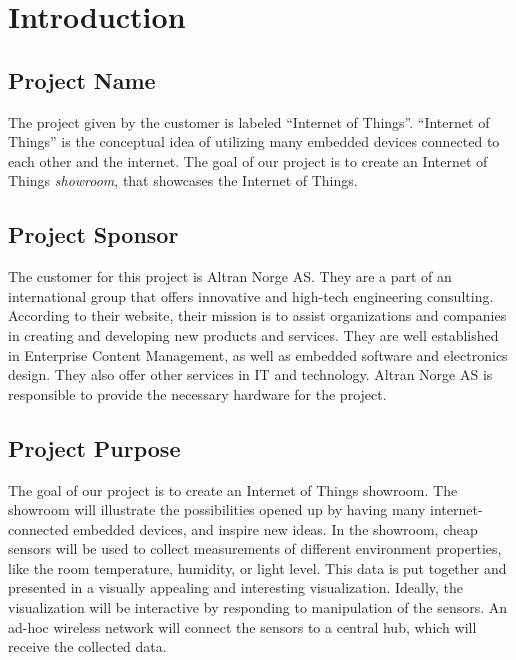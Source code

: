﻿\documentclass[../document.tex]{subfiles}
\begin{document}
\section*{Introduction}

\subsection*{Project Name}
The project given by the customer is labeled ``Internet of Things''. ``Internet of Things'' is the conceptual idea of utilizing many embedded devices connected to each other and the internet. The goal of our project is to create an Internet of Things \emph{showroom}, that showcases the Internet of Things.


\subsection*{Project Sponsor}
The customer for this project is Altran Norge AS. They are a part of an international group that offers innovative and high-tech engineering consulting. According to their website, their mission is to assist organizations and companies in creating and developing new products and services. They are well established in Enterprise Content Management, as well as embedded software and electronics design. They also offer other services in IT and technology. Altran Norge AS is responsible to provide the necessary hardware for the project.

\subsection*{Project Purpose}
The goal of our project is to create an Internet of Things showroom. The showroom will illustrate the possibilities opened up by having many internet-connected embedded devices, and inspire new ideas. In the showroom, cheap sensors will be used to collect measurements of different environment properties, like the room temperature, humidity, or light level. This data is put together and presented in a visually appealing and interesting visualization. Ideally, the visualization will be interactive by responding to manipulation of the sensors. An ad-hoc wireless network will connect the sensors to a central hub, which will receive the collected data.
\end{document}
